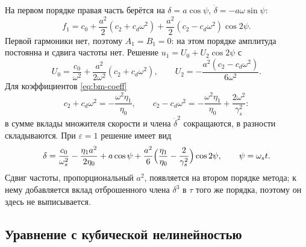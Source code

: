 На первом порядке правая часть берётся на $\delta=a\cos\psi$, $\dot\delta=-a\omega\sin\psi$:
\begin{equation}
\label{eq:f1}
f_1
=c_0+\frac{a^2}{2}(c_2+c_d\omega^2)
+\frac{a^2}{2}(c_2-c_d\omega^2)\cos 2\psi.
\end{equation}
Первой гармоники нет, поэтому $A_1=B_1=0$: на этом порядке амплитуда постоянна и сдвига частоты нет. Решение $u_1=U_0+U_2\cos2\psi$ с
\begin{equation}
\label{eq:U0}
U_0=\frac{c_0}{\omega^2}+\frac{a^2}{2\omega^2}(c_2+c_d\omega^2),
\qquad
U_2=-\frac{a^2(c_2-c_d\omega^2)}{6\omega^2}.
\end{equation}
Для коэффициентов \eqref{eq:bm-coeff}
\begin{equation}
\label{eq:c-plus}
c_2+c_d\omega^2=-\frac{\omega^2\eta_1}{\eta_0},
\qquad
c_2-c_d\omega^2=-\frac{\omega^2\eta_1}{\eta_0}+\frac{2\omega^2}{\gamma_s^2}:
\end{equation}
в сумме вклады множителя скорости и члена $\dot\delta^2$ сокращаются, в разности складываются. При $\varepsilon=1$ решение имеет вид
\begin{equation}
\label{eq:bm-sol}
\delta
=\frac{c_0}{\omega_s^2}-\frac{\eta_1 a^2}{2\eta_0}
+a\cos\psi
+\frac{a^2}{6}\Bigl(\frac{\eta_1}{\eta_0}-\frac{2}{\gamma_s^2}\Bigr)\cos 2\psi,
\qquad
\psi=\omega_s t.
\end{equation}
Сдвиг частоты, пропорциональный $a^2$, появляется на втором порядке метода; к нему добавляется вклад отброшенного члена $\delta^3$ в $\tau$ того же порядка, поэтому он здесь не выписывается.

\subsection{Уравнение с кубической нелинейностью}
\label{sec:bm-cubic}

